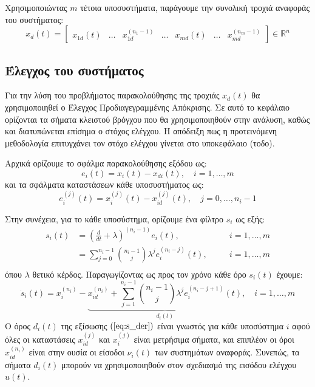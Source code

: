 Χρησιμοποιώντας $m$ τέτοια υποσυστήματα, παράγουμε την συνολική τροχιά αναφοράς του συστήματος:
\begin{equation}
	x_d(t) = \begin{bmatrix}
	x_{1d}(t) & \dots & x_{1d}^{(n_1-1)} & \dots & 
	x_{md}(t) & \dots & x_{md}^{(n_m-1)}
	\end{bmatrix} \in \mathbb{R}^n
	\label{eq:x_desired}
\end{equation}

\subsection{Έλεγχος του συστήματος} %
Για την λύση του προβλήματος παρακολούθησης της τροχιάς $x_d(t)$ θα χρησιμοποιηθεί ο Έλεγχος Προδιαγεγραμμένης Απόκρισης. Σε αυτό το κεφάλαιο ορίζονται τα σήματα κλειστού βρόγχου που θα χρησιμοποιηθούν στην ανάλυση, καθώς και διατυπώνεται επίσημα ο στόχος ελέγχου. Η απόδειξη πως η προτεινόμενη μεθοδολογία επιτυγχάνει τον στόχο ελέγχου γίνεται στο υποκεφάλαιο (τοδο).

Αρχικά ορίζουμε το σφάλμα παρακολούθησης εξόδου ως:
\begin{equation*}
	e_i(t) = x_i(t) - x_{di}(t), \quad i=1,\dots,m
\end{equation*}
και τα σφάλματα καταστάσεων κάθε υποσυστήματος ως:
\begin{equation*}
	e_i^{(j)}(t) = x_i^{(j)}(t) - x_{id}^{(j)}(t), 
	\quad j = 0,\dots, n_i - 1
\end{equation*}

Στην συνέχεια, για το κάθε υποσύστημα, ορίζουμε ένα φίλτρο $s_i$ ως εξής:
\begin{equation}
\begin{alignedat}{2}
	s_i(t) &= \left( 
	\frac{d}{dt} + \lambda
	\right)^{(n_i - 1)} e_i(t), \quad &&i=1,\dots,m \\
	&=\sum_{j=0}^{n_i-1}\binom{n_i-1}{j} \lambda^j e_i^{(n_i-j)}(t), \quad &&i=1,\dots,m \\
\end{alignedat}
\end{equation}
όπου $\lambda$ θετικό κέρδος. Παραγωγίζοντας ως προς τον χρόνο κάθε όρο $s_i(t)$ έχουμε:
\begin{equation}
	\dot{s}_i(t) = x_i^{(n_i)} - 
	\underbrace{x_{id}^{(n_i)} + \sum_{j=1}^{n_i-1}\binom{n_i-1}{j}
	\lambda^j e_i^{(n_i-j+1)}(t)}_{d_i(t)},
	\quad i=1,\dots,m
	\label{eq:s_der}
\end{equation}
Ο όρος $d_i(t)$ της εξίσωσης $(\ref{eq:s_der})$ είναι γνωστός για κάθε υποσύστημα $i$ αφού όλες οι καταστάσεις $x_{id}^{(j)}$ και $x_{i}^{(j)}$ είναι μετρήσιμα σήματα, και επιπλέον οι όροι $x_{id}^{(n_i)}$ είναι στην ουσία οι είσοδοι $\nu_i(t)$ των συστημάτων αναφοράς. Συνεπώς, τα σήματα $d_i(t)$ μπορούν να χρησιμοποιηθούν στον σχεδιασμό της εισόδου ελέγχου $u(t)$.

